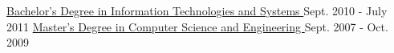 \begin{cventries}
  \cventry
    {\href{https://www.ubi.pt/en/course/64}{Bachelor's Degree in Information Technologies and Systems %
    }} %
    {} %
    {} %
    {Sept. 2010 - July 2011} %
    {
    }
  \vspace{-0.7cm}  
  \cventry
    {\href{https://www.ubi.pt/en/course/804}{Master's Degree in Computer Science and Engineering %
    }} %
    {} %
    {} %
    {Sept. 2007 - Oct. 2009} %
    {
}
\end{cventries}
